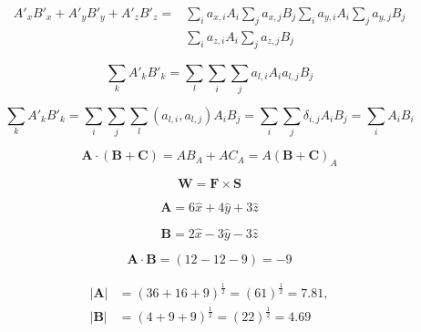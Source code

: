 \documentclass{article}
\begin{document}
	\begin{equation}
		\begin{split}
			A'_x B'_x + A'_y B'_y + A'_z B'_z =
			& \sum_{i} a_{x,i} A_i \sum_{j} a_{x,j} B_j
			\sum_{i} a_{y,i} A_i \sum_{j} a_{y,j} B_j \\
			& \sum_{i} a_{z,i} A_i \sum_{j} a_{z,j} B_j
		\end{split}
		\label{ec23}
	\end{equation}

	\begin{equation}
		\sum_{k} A'_k B'_k =
		\sum_{l} \sum_{i} \sum_{j} a_{l,i} A_i a_{l,j} B_j
		\label{ec24}
	\end{equation}
	
	\begin{equation}
		\sum_{k} A'_k B'_k = 
		\sum_{i} \sum_{j} \sum_{l} (a_{l,i}, a_{l,j}) A_i B_j = 
		\sum_{i} \sum_{j} \delta_{i,j} A_i B_j = 
		\sum_{i} A_i B_i
		\label{ec25}
	\end{equation}

	\begin{equation}
		\textbf{A} \cdot (\textbf{B} + \textbf{C}) = 
		A B_A + A C_A =
		A (\textbf{B} + \textbf{C})_A
		\label{ec26}
	\end{equation}

	\begin{equation}
		\textbf{W} = \textbf{F} \times \textbf{S}
		\label{ec27}
	\end{equation}

	\begin{equation*}
		\textbf{A} = 6 \hat{x} + 4 \hat{y} + 3 \hat{z}
		\label{ec28_1}
	\end{equation*}

	\begin{equation*}
		\textbf{B} = 2 \hat{x} - 3 \hat{y} - 3 \hat{z}
		\label{ec28_2}
	\end{equation*}

	\begin{equation*}
		\textbf{A} \cdot \textbf{B} = (12 - 12 - 9) = -9
		\label{ec28}
	\end{equation*}

	\begin{equation}
		\begin{split}
			|\textbf{A}| &= (36 + 16 + 9)^\frac{1}{2} = 
			(61)^\frac{1}{2} = 7.81, \\
			|\textbf{B}| &= (4 + 9 + 9)^\frac{1}{2} = 
			(22)^\frac{1}{2} = 4.69
		\end{split}
		\label{ec29}
	\end{equation}
\end{document}

